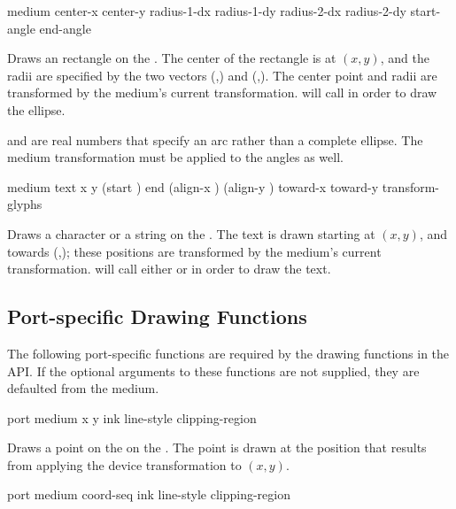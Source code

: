  {medium center-x center-y 
                                    radius-1-dx radius-1-dy radius-2-dx radius-2-dy  
                                    start-angle end-angle}


Draws an rectangle on the  .  The center of the
rectangle is at $(x,y)$, and the radii are specified by the two vectors
(,) and (,).
The center point and radii are transformed by the medium's current
transformation.   will call  in
order to draw the ellipse.

 and  are real numbers that specify an arc
rather than a complete ellipse.  The medium transformation must be applied to
the angles as well.

 {medium text x y
                                 (start ) end
                                 (align-x ) (align-y )
                                 toward-x toward-y transform-glyphs}

Draws a character or a string on the  .  The text is
drawn starting at $(x,y)$, and towards (,); these
positions are transformed by the medium's current transformation.
 will call either  or
 in order to draw the text.


\subsection {Port-specific Drawing Functions}

The following port-specific functions are required by the drawing functions in
the API.  If the optional arguments to these functions are not supplied, they
are defaulted from the medium.

 {port medium x y
                                \optional ink line-style clipping-region}

Draws a point on the   on the  .
The point is drawn at the position that results from applying the device
transformation to $(x,y)$.

 {port medium coord-seq
                                 \optional ink line-style clipping-region}

